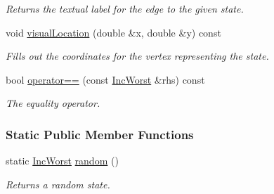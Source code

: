 \begin{DoxyCompactItemize}
\begin{DoxyCompactList}\small\item\em Returns the textual label for the edge to the given state. \end{DoxyCompactList}\item 
void \hyperlink{structdomain_1_1incWorst_1_1IncWorst_a7442e6f8e007bbfc8db48f9807945c42}{visual\+Location} (double \&x, double \&y) const 
\begin{DoxyCompactList}\small\item\em Fills out the coordinates for the vertex representing the state. \end{DoxyCompactList}\item 
bool \hyperlink{structdomain_1_1incWorst_1_1IncWorst_a7a2d2959ff42399e1929edf835aee794}{operator==} (const \hyperlink{structdomain_1_1incWorst_1_1IncWorst}{Inc\+Worst} \&rhs) const 
\begin{DoxyCompactList}\small\item\em The equality operator. \end{DoxyCompactList}\end{DoxyCompactItemize}
\subsubsection*{Static Public Member Functions}
\begin{DoxyCompactItemize}
\item 
static \hyperlink{structdomain_1_1incWorst_1_1IncWorst}{Inc\+Worst} \hyperlink{structdomain_1_1incWorst_1_1IncWorst_a0f3e757bef785bb7b8f57108eb764228}{random} ()
\begin{DoxyCompactList}\small\item\em Returns a random state. \end{DoxyCompactList}\end{DoxyCompactItemize}
